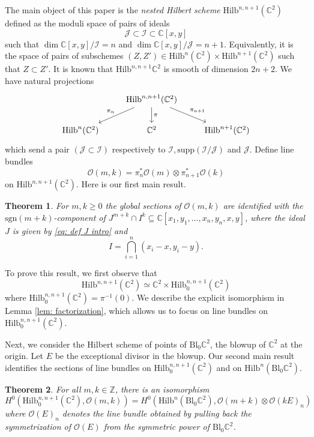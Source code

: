 \documentclass[12pt]{amsart}
\newcommand{\Hilb}{\mathrm{Hilb}}
\newcommand{\C}{\mathbb{C}}
\newcommand{\Z}{\mathbb{Z}}
\newcommand{\CJ}{\mathcal{J}}
\newcommand{\CO}{\mathcal{O}}
\newcommand{\CI}{\mathcal{I}}
\newcommand{\sgn}{\mathrm{sgn}}
\newcommand{\supp}{\mathrm{supp}}
\newcommand{\Bl}{\mathrm{Bl}}
\numberwithin{equation}{section}
\newtheorem{theorem}{Theorem}[section]
\theoremstyle{definition}
\begin{document}
The main object of this paper is the {\em nested Hilbert scheme} $\Hilb^{n,n+1}(\C^2)$ defined as the moduli space of pairs of ideals
$$
\mathcal{J}\subset \mathcal{I}\subset \C[x,y]
$$
such that $\dim \C[x,y]/\CI=n$ and $\dim \C[x,y]/\CJ=n+1.$ Equivalently, it is the space of pairs of subschemes $(Z,Z')\in \Hilb^n(\C^2)\times \Hilb^{n+1}(\C^2)$ such that $Z\subset Z'$. It is known \cite{Cheah,Tikh} that $\Hilb^{n,n+1}\C^2$ is smooth of dimension $2n+2$. We have natural projections
\begin{equation}
\label{eq: nested projections intro}
\begin{tikzcd}
 & \Hilb^{n,n+1}(\C^2) \arrow[swap]{dl}{\pi_n} \arrow{d}{\pi} \arrow{dr}{\pi_{n+1}}& \\
\Hilb^n(\C^2) & \C^2 & \Hilb^{n+1}(\C^2) 
\end{tikzcd}
\end{equation}
which send a pair $(\CJ\subset \CI)$ respectively to $\CI,\supp(\CI/\CJ)$ and $\CJ$.
Define line bundles $$\CO(m,k) = \pi_n^* \CO(m)\otimes \pi_{n+1}^* \CO(k)$$ on $\Hilb^{n,n+1}(\C^2)$. Here is our first main result.


\begin{theorem}\label{thm:polynomialsections}
    For $m,k\ge 0$ the global sections of $\CO(m,k)$ are identified with the $\sgn(m+k)$-component of $J^{m+k}\cap I^k\subseteq \C[x_1,y_1,\dots,x_n,y_n,x,y]$, where the ideal $J$ is given by \eqref{eq: def J intro} and 
    \[  I = \bigcap_{i=1}^n (x_i-x,y_i-y). \]
\end{theorem}

To prove this result, we first observe that 
\begin{equation}
\label{eq: nested centered}
\Hilb^{n,n+1}(\C^2)\simeq \C^2\times \Hilb^{n,n+1}_0(\C^2)
\end{equation}
where $\Hilb^{n,n+1}_0(\C^2)=\pi^{-1}(0)$. We describe the explicit isomorphism in Lemma \ref{lem: factorization}, which allows us to focus on line bundles on $\Hilb^{n,n+1}_0(\C^2)$.

Next, we consider  the Hilbert scheme of points of $\Bl_0\C^2$, the blowup of $\C^2$ at the origin. Let $E$ be the exceptional divisor in the blowup. Our second main result identifies the sections of line bundles on $\Hilb^{n,n+1}_0(\C^2)$ and on $\Hilb^n (\mathrm{Bl}_0 \C^2)$.

\begin{theorem}\label{thm:birationalequiv}
    For all $m,k\in \Z$, there is an isomorphism
    \[ H^0\left(\Hilb^{n,n+1}_0(\C^2),\CO(m,k)\right) = H^0\left(\Hilb^n (\mathrm{Bl}_0 \C^2),\CO(m+k)\otimes \CO(kE)_n\right)  \]
    where $\CO(E)_n$ denotes the line bundle obtained by pulling back the symmetrization of $\CO(E)$ from the symmetric power of $\mathrm{Bl}_0 \C^2$.
\end{theorem}
\end{document}

